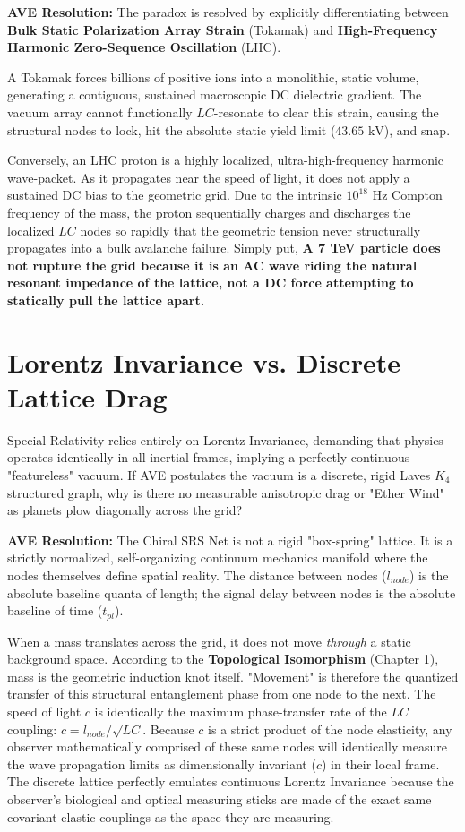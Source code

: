 \textbf{AVE Resolution:} The paradox is resolved by explicitly differentiating between \textbf{Bulk Static Polarization Array Strain} (Tokamak) and \textbf{High-Frequency Harmonic Zero-Sequence Oscillation} (LHC). 

A Tokamak forces billions of positive ions into a monolithic, static volume, generating a contiguous, sustained macroscopic DC dielectric gradient. The vacuum array cannot functionally $LC$-resonate to clear this strain, causing the structural nodes to lock, hit the absolute static yield limit ($43.65 \text{ kV}$), and snap. 

Conversely, an LHC proton is a highly localized, ultra-high-frequency harmonic wave-packet. As it propagates near the speed of light, it does not apply a sustained DC bias to the geometric grid. Due to the intrinsic $10^{18} \text{ Hz}$ Compton frequency of the mass, the proton sequentially charges and discharges the localized $LC$ nodes so rapidly that the geometric tension never structurally propagates into a bulk avalanche failure. Simply put, \textbf{A 7 TeV particle does not rupture the grid because it is an AC wave riding the natural resonant impedance of the lattice, not a DC force attempting to statically pull the lattice apart.}

\section{Lorentz Invariance vs. Discrete Lattice Drag}
Special Relativity relies entirely on Lorentz Invariance, demanding that physics operates identically in all inertial frames, implying a perfectly continuous "featureless" vacuum. If AVE postulates the vacuum is a discrete, rigid Laves $K_4$ structured graph, why is there no measurable anisotropic drag or "Ether Wind" as planets plow diagonally across the grid?

\textbf{AVE Resolution:} The Chiral SRS Net is not a rigid "box-spring" lattice. It is a strictly normalized, self-organizing continuum mechanics manifold where the nodes themselves define spatial reality. The distance between nodes ($l_{node}$) is the absolute baseline quanta of length; the signal delay between nodes is the absolute baseline of time ($t_{pl}$). 

When a mass translates across the grid, it does not move \textit{through} a static background space. According to the \textbf{Topological Isomorphism} (Chapter 1), mass is the geometric induction knot itself. "Movement" is therefore the quantized transfer of this structural entanglement phase from one node to the next. The speed of light $c$ is identically the maximum phase-transfer rate of the $LC$ coupling: $c = l_{node} / \sqrt{LC}$. Because $c$ is a strict product of the node elasticity, any observer mathematically comprised of these same nodes will identically measure the wave propagation limits as dimensionally invariant ($c$) in their local frame. The discrete lattice perfectly emulates continuous Lorentz Invariance because the observer's biological and optical measuring sticks are made of the exact same covariant elastic couplings as the space they are measuring.

